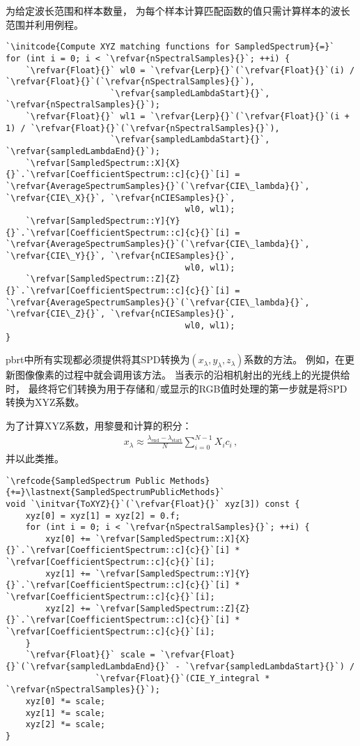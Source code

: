 为给定波长范围和样本数量，
为每个样本计算匹配函数的值只需计算样本的波长范围并利用例程。
\begin{lstlisting}
`\initcode{Compute XYZ matching functions for SampledSpectrum}{=}`
for (int i = 0; i < `\refvar{nSpectralSamples}{}`; ++i) {
    `\refvar{Float}{}` wl0 = `\refvar{Lerp}{}`(`\refvar{Float}{}`(i) / `\refvar{Float}{}`(`\refvar{nSpectralSamples}{}`), 
                     `\refvar{sampledLambdaStart}{}`, `\refvar{nSpectralSamples}{}`);
    `\refvar{Float}{}` wl1 = `\refvar{Lerp}{}`(`\refvar{Float}{}`(i + 1) / `\refvar{Float}{}`(`\refvar{nSpectralSamples}{}`), 
                     `\refvar{sampledLambdaStart}{}`, `\refvar{sampledLambdaEnd}{}`);
    `\refvar[SampledSpectrum::X]{X}{}`.`\refvar[CoefficientSpectrum::c]{c}{}`[i] = `\refvar{AverageSpectrumSamples}{}`(`\refvar{CIE\_lambda}{}`, `\refvar{CIE\_X}{}`, `\refvar{nCIESamples}{}`,
                                    wl0, wl1);
    `\refvar[SampledSpectrum::Y]{Y}{}`.`\refvar[CoefficientSpectrum::c]{c}{}`[i] = `\refvar{AverageSpectrumSamples}{}`(`\refvar{CIE\_lambda}{}`, `\refvar{CIE\_Y}{}`, `\refvar{nCIESamples}{}`,
                                    wl0, wl1);
    `\refvar[SampledSpectrum::Z]{Z}{}`.`\refvar[CoefficientSpectrum::c]{c}{}`[i] = `\refvar{AverageSpectrumSamples}{}`(`\refvar{CIE\_lambda}{}`, `\refvar{CIE\_Z}{}`, `\refvar{nCIESamples}{}`,
                                    wl0, wl1);
}
\end{lstlisting}

pbrt中所有实现都必须提供将其SPD转换为$(x_{\lambda},y_{\lambda},z_{\lambda})$系数的方法。
例如，在更新图像像素的过程中就会调用该方法。
当表示的沿相机射出的光线上的光提供给时，
最终将它们转换为用于存储和/或显示的RGB值时处理的第一步就是将SPD转换为XYZ系数。

为了计算XYZ系数，用黎曼和计算的积分：
\begin{align*}
    x_{\lambda}\approx\frac{\lambda_{\text{end}}-\lambda_{\text{start}}}{N}\sum\limits_{i=0}^{N-1}{X_ic_i}\, ,
\end{align*}
并以此类推。
\begin{lstlisting}
`\refcode{SampledSpectrum Public Methods}{+=}\lastnext{SampledSpectrumPublicMethods}`
void `\initvar{ToXYZ}{}`(`\refvar{Float}{}` xyz[3]) const {
    xyz[0] = xyz[1] = xyz[2] = 0.f;
    for (int i = 0; i < `\refvar{nSpectralSamples}{}`; ++i) {
        xyz[0] += `\refvar[SampledSpectrum::X]{X}{}`.`\refvar[CoefficientSpectrum::c]{c}{}`[i] * `\refvar[CoefficientSpectrum::c]{c}{}`[i];
        xyz[1] += `\refvar[SampledSpectrum::Y]{Y}{}`.`\refvar[CoefficientSpectrum::c]{c}{}`[i] * `\refvar[CoefficientSpectrum::c]{c}{}`[i];
        xyz[2] += `\refvar[SampledSpectrum::Z]{Z}{}`.`\refvar[CoefficientSpectrum::c]{c}{}`[i] * `\refvar[CoefficientSpectrum::c]{c}{}`[i];
    }
    `\refvar{Float}{}` scale = `\refvar{Float}{}`(`\refvar{sampledLambdaEnd}{}` - `\refvar{sampledLambdaStart}{}`) /
                  `\refvar{Float}{}`(CIE_Y_integral * `\refvar{nSpectralSamples}{}`);
    xyz[0] *= scale;
    xyz[1] *= scale;
    xyz[2] *= scale;
}
\end{lstlisting}

